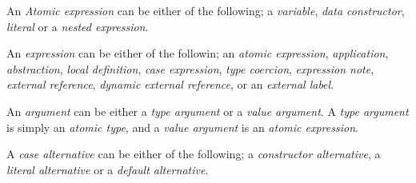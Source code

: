 
An \emph{Atomic expression} can be either of the following; a \emph{variable}, 
\emph{data constructor}, \emph{literal} or a \emph{nested expression}.


An \emph{expression} can be either of the followin; an \emph{atomic expression},
\emph{application}, \emph{abstraction}, \emph{local definition}, \emph{case expression},
\emph{type coercion}, \emph{expression note}, \emph{external reference}, 
\emph{dynamic external reference}, or an \emph{external label}.

%
%
%
%
%
%
%
%


An \emph{argument} can be either a \emph{type argument} or a \emph{value argument}. 
A \emph{type argument} is simply an \emph{atomic type}, and a \emph{value argument} is an 
\emph{atomic expression}.


A \emph{case alternative} can be either of the following; a \emph{constructor alternative}, a
\emph{literal alternative} or a \emph{default alternative}.

